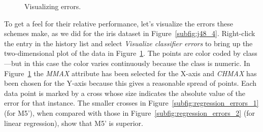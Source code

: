 \begin{figure}[!ht]
\centering
{}
\newline
{}
\caption{\label{fig:regression_errors}Visualizing errors.}
\end{figure}


To get a feel for their relative performance, let’s visualize the
errors these schemes make, as we did for the iris dataset in
Figure~\ref{subfig:j48_4}. Right-click the entry in the history list
and select \textit{Visualize classifier errors} to bring up the
two-dimensional plot of the data in
Figure~\ref{fig:regression_errors}. The points are color coded by
class---but in this case the color varies continuously because the
class is numeric. In Figure~\ref{fig:regression_errors} the
\textit{MMAX} attribute has been selected for the X-axis and
\textit{CHMAX} has been chosen for the Y-axis because this gives a
reasonable spread of points. Each data point is marked by a cross
whose size indicates the absolute value of the error for that
instance. The smaller crosses in
Figure~\ref{subfig:regression_errors_1} (for M5'), when compared with
those in Figure~\ref{subfig:regression_errors_2} (for linear
regression), show that M5' is superior.

